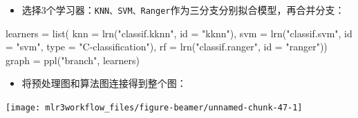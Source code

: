 \documentclass[
  11pt,
  ignorenonframetext,
  dvipsnames,UTF8]{beamer}
\newenvironment{Shaded}{\begin{snugshade}}{\end{snugshade}}
\newcommand{\AttributeTok}[1]{\textcolor[rgb]{0.77,0.63,0.00}{#1}}
\newcommand{\FunctionTok}[1]{\textcolor[rgb]{0.00,0.00,0.00}{#1}}
\newcommand{\NormalTok}[1]{#1}
\newcommand{\OtherTok}[1]{\textcolor[rgb]{0.56,0.35,0.01}{#1}}
\newcommand{\SpecialCharTok}[1]{\textcolor[rgb]{0.00,0.00,0.00}{#1}}
\newcommand{\StringTok}[1]{\textcolor[rgb]{0.31,0.60,0.02}{#1}}
\providecommand{\tightlist}{%
  \setlength{\itemsep}{0pt}\setlength{\parskip}{0pt}}
\begin{document}
\begin{frame}[fragile]{}
\protect\hypertarget{section-38}{}
\begin{itemize}
\tightlist
\item
  选择3个学习器：\texttt{KNN、SVM、Ranger}作为三分支分别拟合模型，再合并分支：
\end{itemize}

\begin{Shaded}
\begin{Highlighting}[]
\NormalTok{learners }\OtherTok{=} \FunctionTok{list}\NormalTok{(}
  \AttributeTok{knn =} \FunctionTok{lrn}\NormalTok{(}\StringTok{"classif.kknn"}\NormalTok{, }\AttributeTok{id =} \StringTok{"kknn"}\NormalTok{),}
  \AttributeTok{svm =} \FunctionTok{lrn}\NormalTok{(}\StringTok{"classif.svm"}\NormalTok{, }\AttributeTok{id =} \StringTok{"svm"}\NormalTok{, }
            \AttributeTok{type =} \StringTok{"C{-}classification"}\NormalTok{),}
  \AttributeTok{rf =} \FunctionTok{lrn}\NormalTok{(}\StringTok{"classif.ranger"}\NormalTok{, }\AttributeTok{id =} \StringTok{"ranger"}\NormalTok{))}
\NormalTok{graph }\OtherTok{=} \FunctionTok{ppl}\NormalTok{(}\StringTok{"branch"}\NormalTok{, learners)}
\end{Highlighting}
\end{Shaded}
\end{frame}

\begin{frame}[fragile]{}
\protect\hypertarget{section-39}{}
\begin{itemize}
\tightlist
\item
  将预处理图和算法图连接得到整个图：
\end{itemize}

\begin{Shaded}
\end{Shaded}

\begin{center}\texttt{[image: mlr3workflow\_files/figure-beamer/unnamed-chunk-47-1]} \end{center}
\end{frame}
\end{document}
